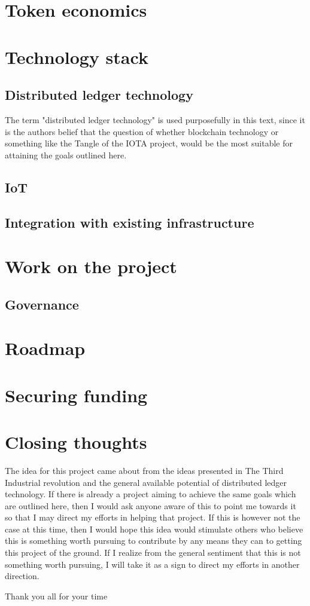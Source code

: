 \documentclass[]{article}
\begin{document}
\section{Token economics}

\section{Technology stack}
\subsection{Distributed ledger technology}
The term "distributed ledger technology" is used purposefully in this text, since it is the authors belief that the question of whether blockchain technology or something like the Tangle of the IOTA project, would be the most suitable for attaining the goals outlined here.  
\subsection{IoT}
\subsection{Integration with existing infrastructure}


\section{Work on the project}
\subsection{Governance}
\section{Roadmap}

\section{Securing funding}

\section{Closing thoughts}
The idea for this project came about from the ideas presented in The Third Industrial revolution and the general available potential of distributed ledger technology. If there is already a project aiming to achieve the same goals which are outlined here, then I would ask anyone aware of this to point me towards it so that I may direct my efforts in helping that project. If this is however not the case at this time, then I would hope this idea would stimulate others who believe this is something worth pursuing to contribute by any means they can to getting this project of the ground. If I realize from the general sentiment that this is not something worth pursuing, I will take it as a sign to direct my efforts in another direction.

Thank you all for your time

 
\end{document}
